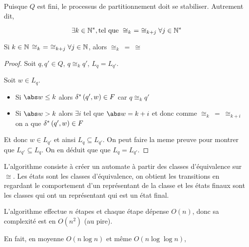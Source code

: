 \begin{remarque}
	Puisque $Q$ est fini, le processus de partitionnement doit se stabiliser. Autrement dit,

	$$\exists k \in \mathbb{N}^*, \text{tel que } \cong_{k} \ = \ \cong_{k+j} \forall j \in \mathbb{N}^* $$
\end{remarque}


\begin{prop}
	Si $k \in \mathbb{N}$ \tq $ \cong_k \ = \ \cong_{k+j} \forall j \in \mathbb{N}$, alors $\cong_k \ = \ \cong$
\end{prop}

\begin{proof}
	Soit $q,q' \in Q$, $q \cong_k q'$, \mq $L_q = L_{q'}$.

	Soit $w \in L_q$.
	\begin{itemize}
		\item Si $\abs w \leq k$ alors $\delta^{*} \left(q',w\right) \in F$ car $q \cong_k q'$
		\item Si $\abs w > k$ alors $\exists i $ tel que $\abs w = k + i$ et donc comme $\cong_k \ = \ \cong_{k+i}$ on a que
		      $\delta^{*} \left(q',w\right) \in F$
	\end{itemize}

	Et donc $w \in L_{q'}$ et ainsi $L_q \subseteq L_{q'}$. On peut faire la meme preuve pour montrer que $L_{q'} \subseteq L_q$.
	On en déduit que que $L_q = L_{q'}$.
\end{proof}

\begin{definition}
	L'algorithme consiste à créer un automate à partir des classes d'équivalence sur $\cong$.
	Les états sont les classes d'équivalence, on obtient les transitions en regardant le comportement
	d'un représentant de la classe et les états finaux sont les classes qui ont un représentant qui est un état final.
\end{definition}


\begin{complexite}
	L'algorithme effectue $n$ étapes et chaque étape dépense $O(n)$, donc sa complexité est en $O(n^2)$ (au pire).

	En fait, en moyenne $O(n \log n)$ et même $O(n \log \log n)$,  \cite{David2010TheAC}
\end{complexite}


